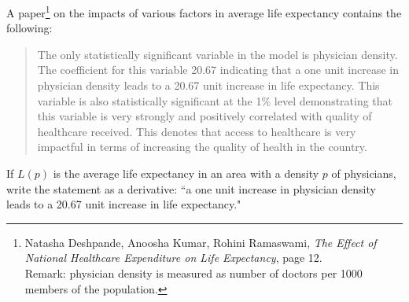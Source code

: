 \begin{frame}[t]
\begin{QuestionSet}
%

\end{QuestionSet}
\end{frame}

\begin{frame}
A paper\footnote{Natasha Deshpande, Anoosha Kumar, Rohini Ramaswami, \textit{The Effect of National Healthcare Expenditure on Life Expectancy}, page 12. 
\\ Remark: physician density is measured as number of doctors per 1000 members of the population.} on the impacts of various factors in average life expectancy contains the following:
\begin{quote}\small
The only statistically significant variable in the model is
physician density. The coefficient for this variable 20.67 indicating that a one unit increase in
physician density leads to a 20.67 unit increase in life expectancy. This variable is also statistically
significant at the 1\% level demonstrating that this variable is very strongly and positively correlated
with quality of healthcare received. This denotes that
access to healthcare is very impactful in terms
of increasing the quality of health in the country. 
\end{quote}
\end{frame}
\begin{frame}
If $L(p)$ is the average life expectancy in an area with a density $p$ of physicians, write the statement as a derivative: ``a one unit increase in
physician density leads to a 20.67 unit increase in life expectancy."\pause\vfill

\answer{\textcolor{answercolor}{$L'(p) = 20.67$}}
\end{frame}


